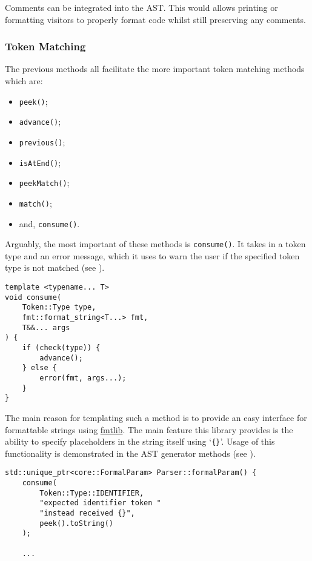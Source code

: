 \begin{todo}
Comments can be integrated into the AST. This would allows
printing or formatting visitors to properly format code whilst
still preserving any comments.
\end{todo}

\subsubsection{Token Matching}

The previous methods all facilitate the more important token
matching methods which are:

\begin{itemize}
    \item \texttt{peek()};
    \item \texttt{advance()};
    \item \texttt{previous()};
    \item \texttt{isAtEnd()};
    \item \texttt{peekMatch()};
    \item \texttt{match()};
    \item and, \texttt{consume()}.
\end{itemize}

Arguably, the most important of these methods is
\texttt{consume()}. It takes in a token type and an error
message, which it uses to warn the user if the specified token
type is not matched (see ).

\begin{lstlisting}[caption={The \texttt{consume()} Parser method
(parser/Parser.hpp).},
label=lst:consume]
template <typename... T>
void consume(
    Token::Type type,
    fmt::format_string<T...> fmt,
    T&&... args
) {
    if (check(type)) {
        advance();
    } else {
        error(fmt, args...);
    }
}
\end{lstlisting}

The main reason for templating such a method is to provide an
easy interface for formattable strings using
\href{https://github.com/fmtlib/fmt}{fmtlib}. The main feature
this library provides is the ability to specify placeholders in
the string itself using `\texttt{\{\}}'. Usage of this
functionality is demonstrated in the AST generator methods (see
).

\begin{lstlisting}[caption={Usage of the \texttt{consume()}
method in the \texttt{formalParam()} generator method
(parser/Parser.cpp).}, label=lst:consumeusage]
std::unique_ptr<core::FormalParam> Parser::formalParam() {
    consume(
        Token::Type::IDENTIFIER,
        "expected identifier token "
        "instead received {}",
        peek().toString()
    );

    ...
\end{lstlisting}


